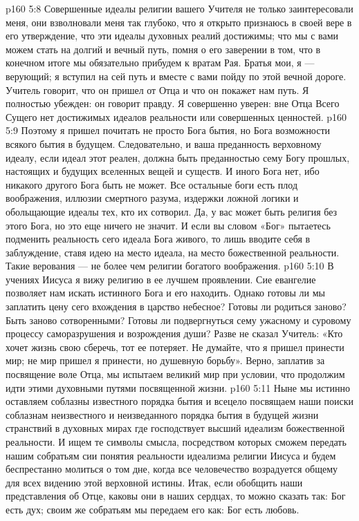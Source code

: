 \vs p160 5:8 Совершенные идеалы религии вашего Учителя не только заинтересовали меня, они взволновали меня так глубоко, что я открыто признаюсь в своей вере в его утверждение, что эти идеалы духовных реалий достижимы; что мы с вами можем стать на долгий и вечный путь, помня о его заверении в том, что в конечном итоге мы обязательно прибудем к вратам Рая. Братья мои, я --- верующий; я вступил на сей путь и вместе с вами пойду по этой вечной дороге. Учитель говорит, что он пришел от Отца и что он покажет нам путь. Я полностью убежден: он говорит правду. Я совершенно уверен: вне Отца Всего Сущего нет достижимых идеалов реальности или совершенных ценностей.
\vs p160 5:9 Поэтому я пришел почитать не просто Бога бытия, но Бога возможности всякого бытия в будущем. Следовательно, и ваша преданность верховному идеалу, если идеал этот реален, должна быть преданностью сему Богу прошлых, настоящих и будущих вселенных вещей и существ. И иного Бога нет, ибо никакого другого Бога быть не может. Все остальные боги есть плод воображения, иллюзии смертного разума, издержки ложной логики и обольщающие идеалы тех, кто их сотворил. Да, у вас может быть религия без этого Бога, но это еще ничего не значит. И если вы словом «Бог» пытаетесь подменить реальность сего идеала Бога живого, то лишь вводите себя в заблуждение, ставя идею на место идеала, на место божественной реальности. Такие верования --- не более чем религии богатого воображения.
\vs p160 5:10 В учениях Иисуса я вижу религию в ее лучшем проявлении. Сие евангелие позволяет нам искать истинного Бога и его находить. Однако готовы ли мы заплатить цену сего вхождения в царство небесное? Готовы ли родиться заново? Быть заново сотворенными? Готовы ли подвергнуться сему ужасному и суровому процессу саморазрушения и возрождения души? Разве не сказал Учитель: «Кто хочет жизнь свою сберечь, тот ее потеряет. Не думайте, что я пришел принести мир; не мир пришел я принести, но душевную борьбу». Верно, заплатив за посвящение воле Отца, мы испытаем великий мир при условии, что продолжим идти этими духовными путями посвященной жизни.
\vs p160 5:11 Ныне мы истинно оставляем соблазны известного порядка бытия и всецело посвящаем наши поиски соблазнам неизвестного и неизведанного порядка бытия в будущей жизни странствий в духовных мирах где господствует высший идеализм божественной реальности. И ищем те символы смысла, посредством которых сможем передать нашим собратьям сии понятия реальности идеализма религии Иисуса и будем беспрестанно молиться о том дне, когда все человечество возрадуется общему для всех видению этой верховной истины. Итак, если обобщить наши представления об Отце, каковы они в наших сердцах, то можно сказать так: Бог есть дух; своим же собратьям мы передаем его как: Бог есть любовь.
